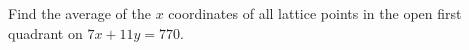 Find the average of the $x$ coordinates of all lattice points in the open first quadrant on $7x+11y=770$.
